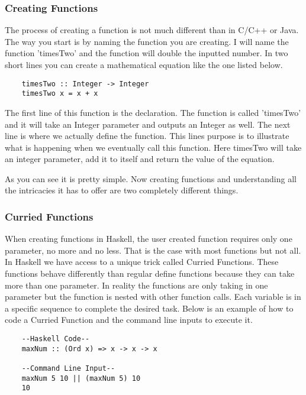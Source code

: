 \documentclass{article}
\begin{document}
    \subsubsection{Creating Functions}
    The process of creating a function is not much different than in C/C++ or Java. The way you start is by naming the function you are creating. I will name the function 'timesTwo' and the function will double the inputted number. In two short lines you can create a mathematical equation like the one listed below. 
    
    \begin{lstlisting}
    timesTwo :: Integer -> Integer
    timesTwo x = x + x 
    \end{lstlisting}
    
    \medskip
    The first line of this function is the declaration. The function is called 'timesTwo' and it will take an Integer parameter and outputs an Integer as well. The next line is where we actually define the function. This lines purpose is to illustrate what is happening when we eventually call this function. Here timesTwo will take an integer parameter, add it to itself and return the value of the equation. 
    
    \medskip
    As you can see it is pretty simple. Now creating functions and understanding all the intricacies it has to offer are two completely different things. 
    
    \subsubsection{Curried Functions}
    When creating functions in Haskell, the user created function requires only one parameter, no more and no less. That is the case with most functions but not all. In Haskell we have access to a unique trick called Curried Functions. These functions behave differently than regular define functions because they can take more than one parameter. In reality the functions are only taking in one parameter but the function is nested with other function calls. Each variable is in a specific sequence to complete the desired task. Below is an example of how to code a Curried Function and the command line inputs to execute it. 
    
    \begin{lstlisting}
    --Haskell Code--
    maxNum :: (Ord x) => x -> x -> x 
    
    --Command Line Input--
    maxNum 5 10 || (maxNum 5) 10
    10
    \end{lstlisting}
    
\end{document}
